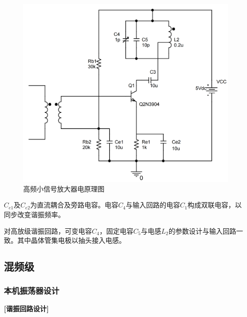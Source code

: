 \documentclass[a4paper,12pt,twoside]{article}
\begin{document}
\begin{itemize}
    \begin{figure}[H]
        \centering
        \includegraphics[scale=0.12]{小信号放大器sch.png}
        \caption{高频小信号放大器电原理图}
        \label{小信号sch}
    \end{figure}
\end{itemize}

$C_{e1}$及$C_{e2}$为直流耦合及旁路电容。电容$C_4$与输入回路的电容$C_1$构成双联电容，以同步改变谐振频率。

对高放级谐振回路，可变电容$C_4$，固定电容$C_5$与电感$L_2$的参数设计与输入回路一致。其中晶体管集电极以抽头接入电感。

\subsection{混频级}

\subsubsection{本机振荡器设计}
\textbf{[谐振回路设计]}
\end{document}
